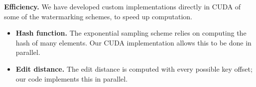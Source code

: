 \smallskip\noindent\textbf{Efficiency.}
%
We have developed custom implementations directly in CUDA of some of the watermarking schemes, to speed up computation.
\begin{itemize}[leftmargin=\itemlm,nosep]
    \item \textbf{Hash function.} The exponential sampling scheme relies on computing the hash of many elements. Our CUDA implementation allows this to be done in parallel.
    \item \textbf{Edit distance.} The edit distance is computed with every possible key offset; our code implements this in parallel.
\end{itemize}
